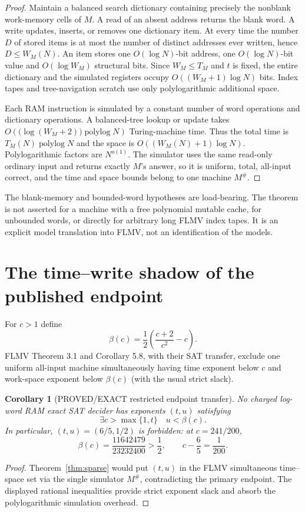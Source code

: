 \documentclass[11pt]{article}
\newtheorem{corollary}{Corollary}
\begin{document}
\begin{proof}
Maintain a balanced search dictionary containing precisely the nonblank
work-memory cells of $M$.  A read of an absent address returns the blank word.
A write updates, inserts, or removes one dictionary item.  At every time the
number $D$ of stored items is at most the number of distinct addresses ever
written, hence $D\le W_M(N)$.  An item stores one $O(\log N)$-bit address, one
$O(\log N)$-bit value and $O(\log W_M)$ structural bits.  Since $W_M\le T_M$
and $t$ is fixed, the entire dictionary and the simulated registers occupy
$O((W_M+1)\log N)$ bits.  Index tapes and tree-navigation scratch use only
polylogarithmic additional space.

Each RAM instruction is simulated by a constant number of word operations
and dictionary operations.  A balanced-tree lookup or update takes
$O(\bigl(\log(W_M+2)\bigr)\operatorname{polylog}N)$ Turing-machine time.
Thus the total time is $T_M(N)\operatorname{polylog}N$ and the space is
$O((W_M(N)+1)\log N)$.  Polylogarithmic factors are $N^{o(1)}$.  The simulator
uses the same read-only ordinary input and returns exactly $M$'s answer, so it
is uniform, total, all-input correct, and the time and space bounds belong to
one machine $M^{\#}$.
\end{proof}

The blank-memory and bounded-word hypotheses are load-bearing.  The theorem
is not asserted for a machine with a free polynomial mutable cache, for
unbounded words, or directly for arbitrary long FLMV index tapes.  It is an
explicit model translation into FLMV, not an identification of the models.

\section{The time--write shadow of the published endpoint}
For $c>1$ define
\[
 \beta(c)=\frac12\left(\frac{c+2}{c^2}-c\right).
\]
FLMV Theorem 3.1 and Corollary 5.8, with their SAT transfer, exclude one
uniform all-input machine simultaneously having time exponent below $c$ and
work-space exponent below $\beta(c)$ (with the usual strict slack).

\begin{corollary}[PROVED/EXACT restricted endpoint transfer]
No charged log-word RAM exact SAT decider has exponents $(t,u)$ satisfying
\[
 \exists c>\max\{1,t\}\quad u<\beta(c).
\]
In particular, $(t,u)=(6/5,1/2)$ is forbidden: at $c=241/200$,
\[
 \beta(c)=\frac{11642479}{23232400}>\frac12,
 \qquad c-\frac65=\frac1{200}.
\]
\end{corollary}
\begin{proof}
Theorem~\ref{thm:sparse} would put $(t,u)$ in the FLMV simultaneous
time--space set via the single simulator $M^{\#}$, contradicting the primary
endpoint.  The displayed rational inequalities provide strict exponent
slack and absorb the polylogarithmic simulation overhead.
\end{proof}
\end{document}
